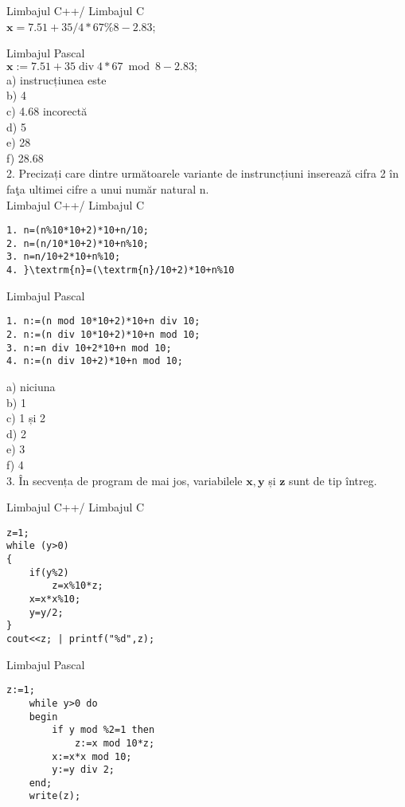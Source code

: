 Limbajul C++/ Limbajul C\\
$\mathbf{x}=7.51+35 / 4 * 67 \% 8-2.83$;

Limbajul Pascal\\
$\mathbf{x}:=7.51+35 \operatorname{div} 4 * 67 \bmod 8-2.83 ;$\\
a) instrucțiunea este\\
b) 4\\
c) 4.68 incorectă\\
d) 5\\
e) 28\\
f) 28.68\\
2. Precizați care dintre următoarele variante de instruncțiuni inserează cifra 2 în faţa ultimei cifre a unui număr natural n.\\
Limbajul C++/ Limbajul C

\begin{verbatim}
1. n=(n%10*10+2)*10+n/10;
2. n=(n/10*10+2)*10+n%10;
3. n=n/10+2*10+n%10;
4. }\textrm{n}=(\textrm{n}/10+2)*10+n%10
\end{verbatim}

Limbajul Pascal

\begin{verbatim}
1. n:=(n mod 10*10+2)*10+n div 10;
2. n:=(n div 10*10+2)*10+n mod 10;
3. n:=n div 10+2*10+n mod 10;
4. n:=(n div 10+2)*10+n mod 10;
\end{verbatim}

a) niciuna\\
b) 1\\
c) 1 și 2\\
d) 2\\
e) 3\\
f) 4\\
3. În secvența de program de mai jos, variabilele $\mathbf{x}, \mathbf{y}$ și $\mathbf{z}$ sunt de tip întreg.

Limbajul C++/ Limbajul C

\begin{verbatim}
z=1;
while (y>0)
{
    if(y%2)
        z=x%10*z;
    x=x*x%10;
    y=y/2;
}
cout<<z; | printf("%d",z);
\end{verbatim}

Limbajul Pascal

\begin{verbatim}
z:=1;
    while y>0 do
    begin
        if y mod %2=1 then
            z:=x mod 10*z;
        x:=x*x mod 10;
        y:=y div 2;
    end;
    write(z);
\end{verbatim}

